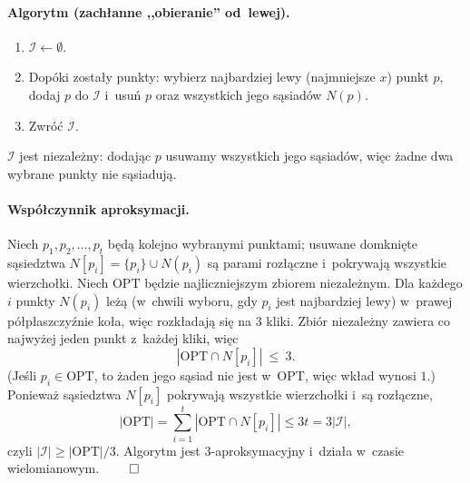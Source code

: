 \paragraph{Algorytm (zachłanne ,,obieranie'' od~lewej).}
\begin{enumerate}[nosep]
	\item $\mathcal{I}\leftarrow\emptyset$.
	\item Dopóki zostały punkty: wybierz najbardziej lewy (najmniejsze $x$) punkt
	      $p$, dodaj $p$ do $\mathcal{I}$ i~usuń $p$ oraz wszystkich jego sąsiadów
	      $N(p)$.
	\item Zwróć $\mathcal{I}$.
\end{enumerate}
$\mathcal{I}$ jest niezależny: dodając $p$ usuwamy wszystkich jego sąsiadów, więc
żadne dwa wybrane punkty nie sąsiadują.

\paragraph{Współczynnik aproksymacji.}
Niech $p_1,p_2,\dots,p_t$ będą kolejno wybranymi punktami; usuwane domknięte
sąsiedztwa $N[p_i]=\{p_i\}\cup N(p_i)$ są parami rozłączne i~pokrywają wszystkie
wierzchołki. Niech $\mathrm{OPT}$ będzie najliczniejszym zbiorem niezależnym.
Dla każdego $i$ punkty $N(p_i)$ leżą (w~chwili wyboru, gdy $p_i$ jest najbardziej
lewy) w~prawej półpłaszczyźnie koła, więc rozkładają się na $3$ kliki. Zbiór
niezależny zawiera co najwyżej jeden punkt z~każdej kliki, więc
\[
	|\mathrm{OPT}\cap N[p_i]|\ \le\ 3.
\]
(Jeśli $p_i\in\mathrm{OPT}$, to żaden jego sąsiad nie jest w~$\mathrm{OPT}$, więc
wkład wynosi $1$.) Ponieważ sąsiedztwa $N[p_i]$ pokrywają wszystkie wierzchołki
i~są rozłączne,
\[
	|\mathrm{OPT}|=\sum_{i=1}^t|\mathrm{OPT}\cap N[p_i]|\le 3t=3|\mathcal{I}|,
\]
czyli $|\mathcal{I}|\ge|\mathrm{OPT}|/3$. Algorytm jest $3$-aproksymacyjny
i~działa w~czasie wielomianowym. $\qed$
